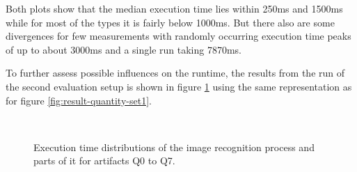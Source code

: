 Both plots show that the median execution time lies within 250ms and 1500ms while for most of the types it is fairly below 1000ms. But there also are some divergences for few measurements with randomly occurring execution time peaks of up to about 3000ms and a single run taking 7870ms.

To further assess possible influences on the runtime, the results from the run of the second evaluation setup is shown in figure \ref{fig:result-quantity} using the same representation as for figure \ref{fig:result-quantity-set1}.

\begin{figure}[h!]
	\centering
	\qquad
	\\
	\qquad
	\caption{Execution time distributions of the image recognition process and parts of it for artifacts Q0 to Q7.}\label{fig:result-quantity}
\end{figure}

